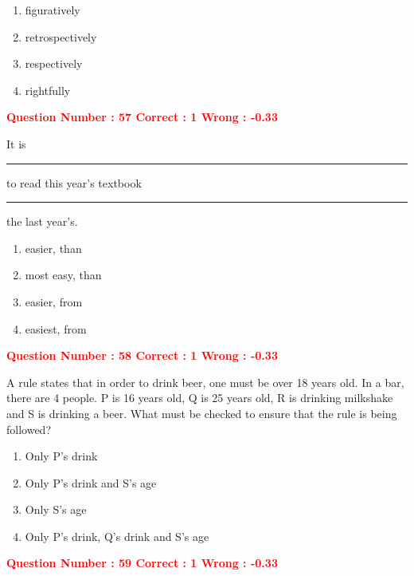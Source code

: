 \documentclass[12pt]{article}
\begin{document}
{\begin{enumerate}[label=(\Alph*)]
    \item figuratively
    \item retrospectively
    \item respectively
    \item rightfully
\end{enumerate}

\vspace{1em}


\textcolor{red}{\textbf{Question Number : 57 \hfill Correct : 1  Wrong : -0.33}}

\vspace{0.5em}

It is \rule{2cm}{0.4pt} to read this year’s textbook \rule{2cm}{0.4pt} the last year’s.

\begin{enumerate}[label=(\Alph*)]
    \item easier, than
    \item most easy, than
    \item easier, from
    \item easiest, from
\end{enumerate}

\vspace{1em}


\textcolor{red}{\textbf{Question Number : 58 \hfill Correct : 1  Wrong : -0.33}}

\vspace{0.5em}

A rule states that in order to drink beer, one must be over 18 years old. In a bar, there are 4 people. P is 16 years old, Q is 25 years old, R is drinking milkshake and S is drinking a beer. What must be checked to ensure that the rule is being followed?

\begin{enumerate}[label=(\Alph*)]
    \item Only P’s drink
    \item Only P’s drink and S’s age
    \item Only S’s age
    \item Only P’s drink, Q’s drink and S’s age
\end{enumerate}

\vspace{1em}


\textcolor{red}{\textbf{Question Number : 59 \hfill Correct : 1  Wrong : -0.33}}

\vspace{0.5em}

}
\end{document}
